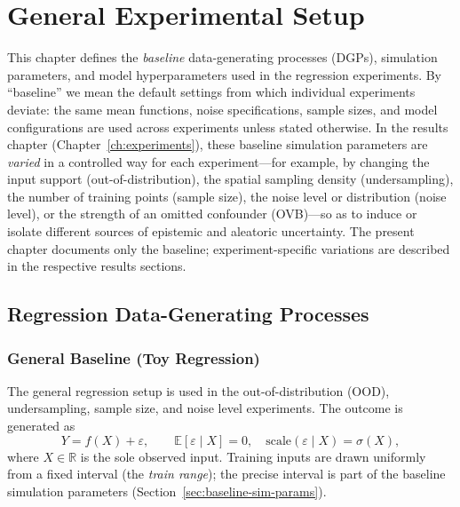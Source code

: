 
\chapter{General Experimental Setup}
\label{ch:experimental-setup}

This chapter defines the \emph{baseline} data-generating processes (DGPs), simulation parameters, and model hyperparameters used in the regression experiments. By ``baseline'' we mean the default settings from which individual experiments deviate: the same mean functions, noise specifications, sample sizes, and model configurations are used across experiments unless stated otherwise. In the results chapter (Chapter~\ref{ch:experiments}), these baseline simulation parameters are \emph{varied} in a controlled way for each experiment---for example, by changing the input support (out-of-distribution), the spatial sampling density (undersampling), the number of training points (sample size), the noise level or distribution (noise level), or the strength of an omitted confounder (OVB)---so as to induce or isolate different sources of epistemic and aleatoric uncertainty. The present chapter documents only the baseline; experiment-specific variations are described in the respective results sections.

\section{Regression Data-Generating Processes}
\label{sec:regression-dgp}

\subsection{General Baseline (Toy Regression)}
\label{sec:general-baseline-dgp}

The general regression setup is used in the out-of-distribution (OOD), undersampling, sample size, and noise level experiments. The outcome is generated as
\begin{equation}
  Y = f(X) + \varepsilon, \qquad \mathbb{E}[\varepsilon \mid X] = 0, \quad \text{scale}(\varepsilon \mid X) = \sigma(X),
\end{equation}
where \(X \in \mathbb{R}\) is the sole observed input. Training inputs are drawn uniformly from a fixed interval (the \emph{train range}); the precise interval is part of the baseline simulation parameters (Section~\ref{sec:baseline-sim-params}).

